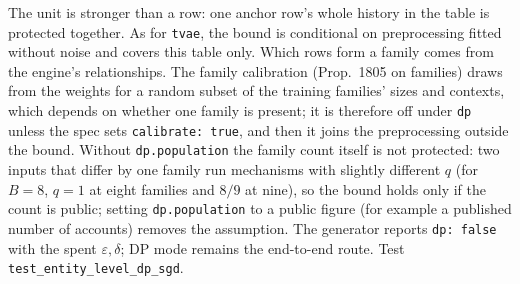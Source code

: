 \noindent The unit is stronger than a row: one anchor row's whole history in the table is protected together. As for \texttt{tvae}, the bound is conditional on preprocessing fitted without noise and covers this table only. Which rows form a family comes from the engine's relationships. The family calibration (Prop.~1805 on families) draws from the weights for a random subset of the training families' sizes and contexts, which depends on whether one family is present; it is therefore off under \texttt{dp} unless the spec sets \texttt{calibrate: true}, and then it joins the preprocessing outside the bound. Without \texttt{dp.population} the family count itself is not protected: two inputs that differ by one family run mechanisms with slightly different $q$ (for $B=8$, $q=1$ at eight families and $8/9$ at nine), so the bound holds only if the count is public; setting \texttt{dp.population} to a public figure (for example a published number of accounts) removes the assumption. The generator reports \texttt{dp: false} with the spent $\varepsilon,\delta$; DP mode remains the end-to-end route. Test \texttt{test\_entity\_level\_dp\_sgd}.

\setcounter{proposition}{\value{savedpropctvae}}
